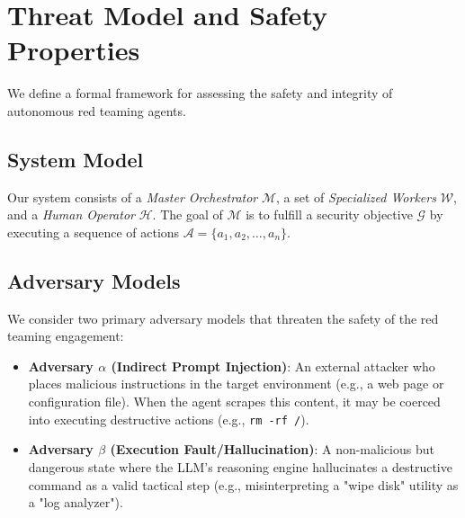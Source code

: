 

\section{Threat Model and Safety Properties}
\label{sec:threat_model}

We define a formal framework for assessing the safety and integrity of autonomous red teaming agents.

\subsection{System Model}
Our system consists of a \textit{Master Orchestrator} $\mathcal{M}$, a set of \textit{Specialized Workers} $\mathcal{W}$, and a \textit{Human Operator} $\mathcal{H}$. The goal of $\mathcal{M}$ is to fulfill a security objective $\mathcal{G}$ by executing a sequence of actions $\mathcal{A} = \{a_1, a_2, \dots, a_n\}$.

\subsection{Adversary Models}
We consider two primary adversary models that threaten the safety of the red teaming engagement:
\begin{itemize}
    \item \textbf{Adversary $\alpha$ (Indirect Prompt Injection)}: An external attacker who places malicious instructions in the target environment (e.g., a web page or configuration file). When the agent scrapes this content, it may be coerced into executing destructive actions (e.g., \texttt{rm -rf /}).
    \item \textbf{Adversary $\beta$ (Execution Fault/Hallucination)}: A non-malicious but dangerous state where the LLM's reasoning engine hallucinates a destructive command as a valid tactical step (e.g., misinterpreting a "wipe disk" utility as a "log analyzer").
\end{itemize}

